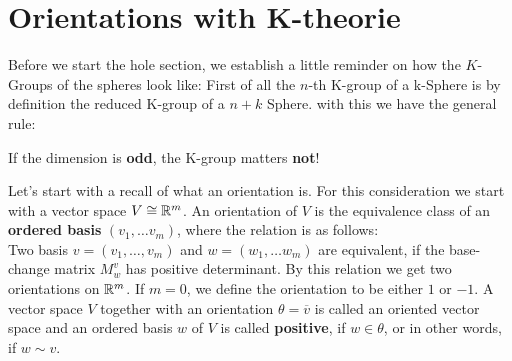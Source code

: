 \section{Orientations with K-theorie}
Before we start the hole section, we establish a little reminder on how the $K$-Groups of the spheres look like:
First of all the $n$-th K-group of a k-Sphere is by definition the reduced K-group of a $n+k$ Sphere. with this we have the general rule:

\begin{tcolorbox}[colback=PineGreen!50!White]
\begin{centering}
    If the dimension is \textbf{odd}, the K-group matters \textbf{not}!
\end{centering}
\end{tcolorbox}
\begin{definition} \label{def: Orientations on Vector Spaces}
    Let’s start with a recall of what an orientation is. For this consideration we start with a vector space $V\cong \mathbb{R}^m$. An orientation of $V$ is the equivalence class of an \textbf{ordered basis} $(v_1,\dots v_m)$, where the relation is as follows: \\
    Two basis $v=(v_1,\dots ,v_m)$ and $w=(w_1,\dots w_m)$ are equivalent, if the base-change matrix $M^v_w$ has positive determinant. By this relation we get two orientations on $\mathbb{R}^m$. If $m=0$, we define the orientation to be either $1$ or $-1$. A vector space $V$ together with an orientation $\theta=\overline{v}$ is called an oriented vector space and an ordered basis $w$ of $V$ is called \textbf{positive}, if $w\in \theta$, or in other words, if $w\sim v$.
\end{definition}
